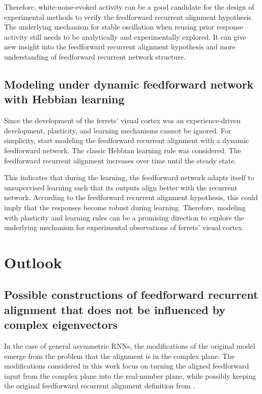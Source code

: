 \documentclass[11pt]{article}
\begin{document}
	Therefore, white-noise-evoked activity can be a good candidate for the design of experimental methods to verify the feedforward recurrent alignment hypothesis. The underlying mechanism for stable oscillation when reusing prior response activity still needs to be analytically and experimentally explored. It can give new insight into the feedforward recurrent alignment hypothesis and more understanding of feedforward recurrent network structure.
	
	\subsection*{Modeling under dynamic feedforward network with Hebbian learning}
	Since the development of the ferrets' visual cortex was an experience-driven development, plasticity, and learning mechanisms cannot be ignored. For simplicity, start modeling the feedforward recurrent alignment with a dynamic feedforward network. The classic Hebbian learning rule was considered. The feedforward recurrent alignment increases over time until the steady state. 
	
	This indicates that during the learning, the feedforward network adapts itself to unsupervised learning such that its outputs align better with the recurrent network. According to the feedforward recurrent alignment hypothesis, this could imply that the responses become robust during learning. Therefore, modeling with plasticity and learning rules can be a promising direction to explore the underlying mechanism for experimental observations of ferrets' visual cortex.
	
	\section{Outlook}
	\subsection*{Possible constructions of feedforward recurrent alignment that does not be influenced by complex eigenvectors}
	In the case of general asymmetric RNNs, the modifications of the original model emerge from the problem that the alignment is in the complex plane. The modifications considered in this work focus on turning the aligned feedforward input from the complex plane into the real-number plane, while possibly keeping the original feedforward recurrent alignment definition from \cite{tragenap2023nature}. 
	
\end{document}
